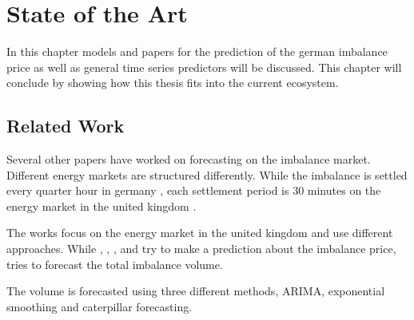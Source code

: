 \documentclass[class=scrbook, crop=false]{standalone}
\begin{document}
\chapter{State of the Art}
\label{Chapter::State_of_the_Art} %

In this chapter models and papers for the prediction of the german imbalance price as well as general time series predictors will be discussed. 
This chapter will conclude by showing how this thesis fits into the current ecosystem.

\section{Related Work}
\label{Section::Related_Work}

Several other papers have worked on forecasting on the imbalance market. Different energy markets are structured differently. While the imbalance is settled every quarter hour in germany \cite{narajewskiProbabilisticForecastingGerman2022}, each settlement period is 30 minutes on the energy market in the united kingdom \cite{limaBayesianPredictiveDistributions2023}.


The works \cite{limaBayesianPredictiveDistributions2023} \cite{ganeshForecastingImbalancePrice2024} \cite{garciaForecastingSystemImbalance2006} \cite{browellPredictingElectricityImbalance2022} \cite{lucasPriceForecastingBalancing2020} \cite{dengSeasonalityDeepLearning2024} focus on the energy market in the united kingdom and use different approaches. While \cite{limaBayesianPredictiveDistributions2023}, \cite{ganeshForecastingImbalancePrice2024}, \cite{browellPredictingElectricityImbalance2022}, \cite{lucasPriceForecastingBalancing2020} and \cite{dengSeasonalityDeepLearning2024} try to make a prediction about the imbalance price, \cite{garciaForecastingSystemImbalance2006} tries to forecast the total imbalance volume. 

The volume is forecasted using three different methods, ARIMA, exponential smoothing and caterpillar forecasting.
\end{document}
